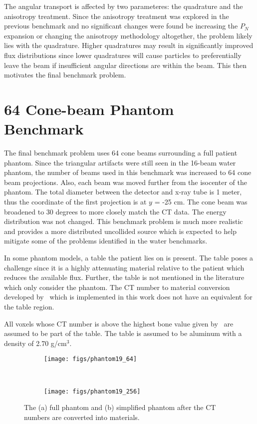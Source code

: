 The angular transport is affected by two parameteres: the quadrature and the anisotropy treatment. Since the anisotropy treatment was explored in the previous benchmark and no significant changes were found be increasing the $P_N$ expansion or changing the anisotropy methodology altogether, the problem likely lies with the quadrature. Higher quadratures may result in significantly improved flux distributions since lower quadratures will cause particles to preferentially leave the beam if insufficient angular directions are within the beam. This then motivates the final benchmark problem.


\section{64 Cone-beam Phantom Benchmark}

The final benchmark problem uses 64 cone beams surrounding a full patient phantom. Since the triangular artifacts were still seen in the 16-beam water phantom, the number of beams used in this benchmark was increased to 64 cone beam projections. Also, each beam was moved further from the isocenter of the phantom. The total diameter between the detector and x-ray tube is 1 meter, thus the coordinate of the first projection is at $y$ = -25 cm. The cone beam was broadened to 30 degrees to more closely match the CT data. The energy distribution was not changed. This benchmark problem is much more realistic and provides a more distributed uncollided source which is expected to help mitigate some of the problems identified in the water benchmarks.

In some phantom models, a table the patient lies on is present. The table poses a challenge since it is a highly attenuating material relative to the patient which reduces the available flux. Further, the table is not mentioned in the literature which only consider the phantom. The CT number to material conversion developed by~\citet{ref:ottossonr} which is implemented in this work does not have an equivalent for the table region.

All voxels whose CT number is above the highest bone value given by~\citet{ref:ottossonr} are assumed to be part of the table. The table is assumed to be aluminum with a density of 2.70 g/cm$^{3}$.

\begin{figure}
    \centering
    \begin{subfigure}[b]{0.45\textwidth}
        \texttt{[image: figs/phantom19\_64]}
        \caption{}
        \label{fig:waterHistLin}
    \end{subfigure}
    ~
    \begin{subfigure}[b]{0.45\textwidth}
        \texttt{[image: figs/phantom19\_256]}
        \caption{}
        \label{fig:waterHistLog}
    \end{subfigure}
    \caption{The (a) full phantom and (b) simplified phantom after the CT numbers are converted into materials.}\label{fig:waterHist}
\end{figure}

